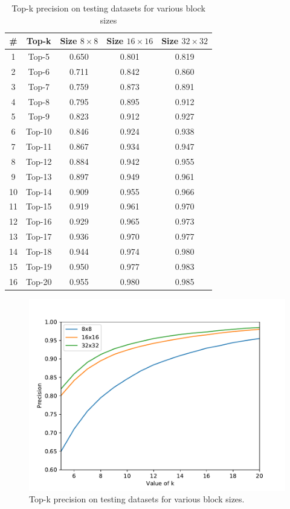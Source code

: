 \begin{table}
    \caption{Top-k precision on testing datasets for various 
    block sizes}
    \bigskip\label{tab:valprecision}
    \centering
    \begin{tabular}{c c c c c}
        \toprule
        \# & Top-k & Size \(8\times8\) & Size \(16\times16\) & Size \(32\times32\) \\
        \midrule
        1 & Top-5 & 0.650     & 0.801  & 0.819 \\
        2 & Top-6  & 0.711    & 0.842  & 0.860 \\
        3 & Top-7  & 0.759    & 0.873  & 0.891 \\
        4 & Top-8  & 0.795    & 0.895  & 0.912 \\
        5 & Top-9  & 0.823    & 0.912  & 0.927 \\
        6 & Top-10  & 0.846   & 0.924   & 0.938 \\
        7 & Top-11  & 0.867   & 0.934   & 0.947 \\
        8 & Top-12  & 0.884   & 0.942   & 0.955 \\
        9 & Top-13  & 0.897   & 0.949   & 0.961 \\
        10 & Top-14  & 0.909  & 0.955   & 0.966 \\
        11 & Top-15  & 0.919  & 0.961   & 0.970 \\
        12 & Top-16  & 0.929  & 0.965   & 0.973 \\
        13 & Top-17  & 0.936  & 0.970   & 0.977 \\
        14 & Top-18  & 0.944  & 0.974   & 0.980 \\
        15 & Top-19  & 0.950  & 0.977   & 0.983 \\
        16 & Top-20  & 0.955  & 0.980   & 0.985 \\
        \bottomrule
    \end{tabular}
\end{table}

\begin{figure}
    \centering
    \includegraphics[width=\textwidth,height=\textheight,keepaspectratio]{Figures/topkPrecisions.pdf}
    \caption[Top-k precision on testing datasets for various 
    block sizes]
    {Top-k precision on testing datasets for various 
    block sizes.}\label{fig:topkPrecisions}
\end{figure}
